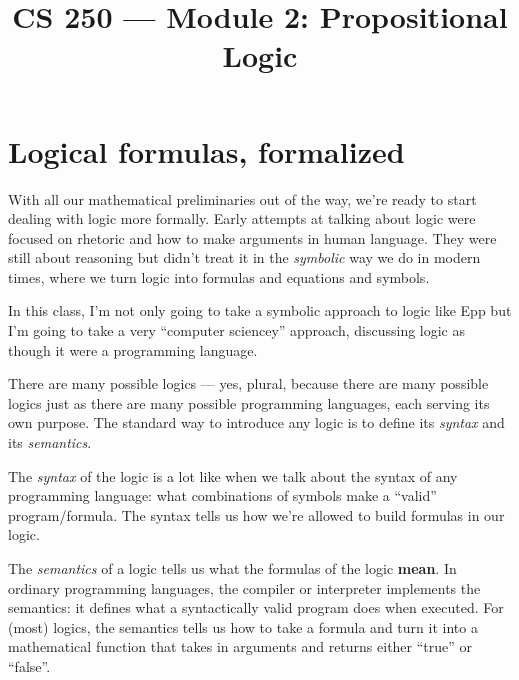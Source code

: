 \documentclass[11pt]{article}
\title{CS 250 --- Module 2: Propositional Logic}
\author{}
\date{}
\begin{document}
\maketitle

\begin{readingmap}



\end{readingmap}

\section{Logical formulas, formalized}
With all our mathematical preliminaries out of the way, we're ready to start dealing with logic more formally. Early attempts at talking about logic were focused on rhetoric and how to make arguments in human language. They were still about reasoning but didn't treat it in the \emph{symbolic} way we do in modern times, where we turn logic into formulas and equations and symbols.

In this class, I'm not only going to take a symbolic approach to logic like Epp but I'm going to take a very ``computer sciencey'' approach, discussing logic as though it were a programming language.

There are many possible logics --- yes, plural, because there are many possible logics just as there are many possible programming languages, each serving its own purpose. The standard way to introduce any logic is to define its \emph{syntax} and its \emph{semantics}.

The \emph{syntax} of the logic is a lot like when we talk about the syntax of any programming language: what combinations of symbols make a ``valid'' program/formula. The syntax tells us how we're allowed to build formulas in our logic.

The \emph{semantics} of a logic tells us what the formulas of the logic \textbf{mean}. In ordinary programming languages, the compiler or interpreter implements the semantics: it defines what a syntactically valid program does when executed. For (most) logics, the semantics tells us how to take a formula and turn it into a mathematical function that takes in arguments and returns either ``true'' or ``false''.
\end{document}
